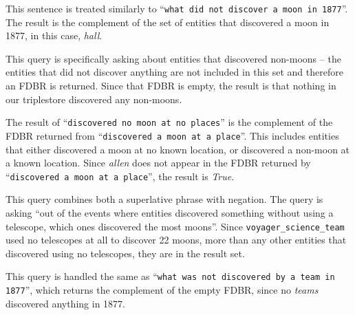 \documentclass[../main.tex]{subfiles}
\begin{document}
\begin{refsection}
\examplespacing


\examplespacing

\noindent This sentence is treated similarly to ``\texttt{what did not discover a moon in 1877}''.  The result is the complement of the set of entities that discovered a moon in 1877, in this case, \textit{hall}.

\examplespacing


\examplespacing

\noindent This query is specifically asking about entities that discovered non-moons -- the entities that did not discover anything are not included in this set and therefore an FDBR is returned.  Since that FDBR is empty, the result is that nothing in our triplestore discovered any non-moons.

\examplespacing


\examplespacing

\noindent The result of ``\texttt{discovered no moon at no places}'' is the complement of the FDBR returned from ``\texttt{discovered a moon at a place}''.  This includes entities that either discovered a moon at no known location, or discovered a non-moon at a known location.  Since \textit{allen} does not appear in the FDBR returned by ``\texttt{discovered a moon at a place}'', the result is \textit{True}.

\examplespacing


\examplespacing

\noindent This query combines both a superlative phrase with negation.  The query is asking ``out of the events where entities discovered something without using a telescope, which ones discovered the most moons''.  Since \texttt{voyager\_science\_team} used no telescopes at all to discover 22 moons, more than any other entities that discovered using no telescopes, they are in the result set.

\examplespacing


\examplespacing

\noindent This query is handled the same as ``\texttt{what was not discovered by a team in 1877}'', which returns the complement of the empty FDBR, since no \textit{teams} discovered anything in 1877.


\end{refsection}
\end{document}
